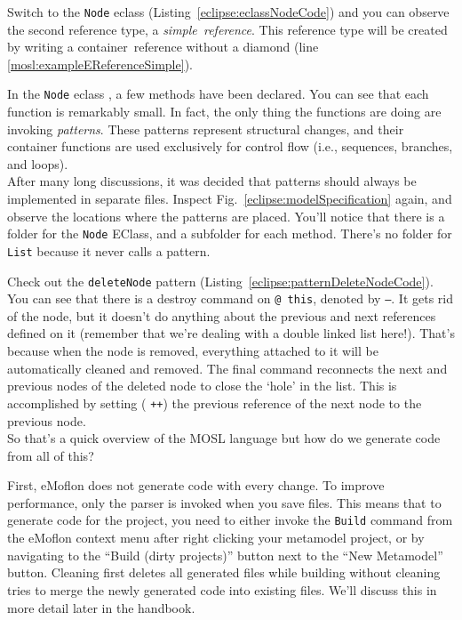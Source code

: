 Switch to the \texttt{Node} eclass (Listing~\ref{eclipse:eclassNodeCode}) and you can observe the second reference type, a \emph{simple~reference}. This reference type will be created by writing a container~reference without a diamond (line \ref{mosl:exampleEReferenceSimple}).

In the \texttt{Node} eclass , a few methods have been declared. You can see that each function is remarkably small. In fact,
the only thing the functions are doing are invoking \emph{patterns}. These patterns represent structural changes, and their container functions are used
exclusively for control flow (i.e., sequences, branches, and loops). \\[8mm]



After many long discussions, it was decided that patterns should always be implemented in separate files. Inspect Fig.~\ref{eclipse:modelSpecification} again,
and observe the locations where the patterns are placed. You'll notice that
there is a folder for the \texttt{Node} EClass, and a subfolder for each method.
There's no folder for \texttt{List} because it never calls a pattern.

Check out the \texttt{deleteNode} pattern (Listing~\ref{eclipse:patternDeleteNodeCode}). You can see that there is a destroy command on \texttt{@ {\color{VIOLET}this}}, denoted by
{\color{RED} \texttt{--}}. It gets rid of the node, but it doesn't do anything about the previous and next references defined on it (remember that we're dealing with a
double linked list here!). That's because when the node is removed, everything attached to it will be automatically cleaned and removed. The final command
reconnects the next and previous nodes of the deleted node to close the `hole' in the list. This is accomplished by setting ({\color{GREEN} \texttt{++}}) the previous reference
of the next node to the previous node. \\[8mm]


 
So that's a quick overview of the MOSL language but how do we generate code from all of this?

First, eMoflon does not generate code with every change. To improve performance, only the parser is invoked when you save files. This means that to generate
code for the project, you need to either invoke the \texttt{Build} command from the eMoflon context menu after right clicking your metamodel
project, or by navigating to the ``Build (dirty projects)'' button next to the ``New Metamodel'' button. Cleaning first deletes all generated files while
building without cleaning tries to merge the newly generated code into existing files. We'll discuss this in more detail later in the handbook.

